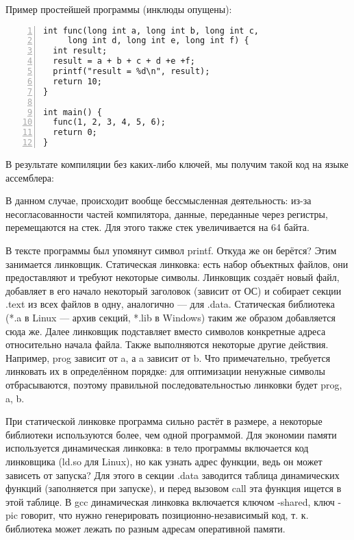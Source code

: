 \documentclass[main]{subfiles}
\begin{document}
Пример простейшей программы (инклюды опущены):
\begin{lstlisting}[numbers=left]
int func(long int a, long int b, long int c,
	 long int d, long int e, long int f) {
  int result;
  result = a + b + c + d +e +f;
  printf("result = %d\n", result);
  return 10;
}

int main() {
  func(1, 2, 3, 4, 5, 6);
  return 0;
}
\end{lstlisting}

В результате компиляции без каких-либо ключей, мы получим такой код на
языке ассемблера:


В данном случае, происходит вообще бессмысленная деятельность: из-за несогласованности
частей компилятора, данные, переданные через регистры, перемещаются на стек.
Для этого также стек увеличивается на 64 байта.

В тексте программы был упомянут символ printf. Откуда же он берётся?
Этим занимается линковщик.
Статическая линковка: есть набор объектных файлов, они предоставляют и требуют
некоторые символы. Линковщик создаёт новый файл, добавляет в его начало
некоторый заголовок (зависит от ОС) и собирает секции .text из всех
файлов в одну, аналогично --- для .data. Статическая библиотека (*.a в Linux ---
архив секций, *.lib в Windows) таким же образом добавляется сюда же.
Далее линковщик подставляет вместо символов конкретные адреса относительно
начала файла. Также выполняются некоторые другие действия.
Например, prog зависит от a, а a зависит от b. Что примечательно,
требуется линковать их в определённом порядке: для оптимизации ненужные
символы отбрасываются, поэтому правильной последовательностью линковки
будет prog, a, b.

При статической линковке программа сильно растёт в размере, а некоторые
библиотеки используются более, чем одной программой. Для экономии памяти
используется динамическая линковка: в тело программы включается код
линковщика (ld.so для Linux), но как узнать адрес функции, ведь он может
зависеть от запуска? Для этого в секции .data заводится таблица динамических
функций (заполняется при запуске), и перед вызовом call эта функция ищется
в этой таблице. В gcc динамическая линковка включается ключом -shared,
ключ -pic говорит, что нужно генерировать позиционно-независимый код, т. к. 
библиотека может лежать по разным адресам оперативной памяти.
\end{document}
